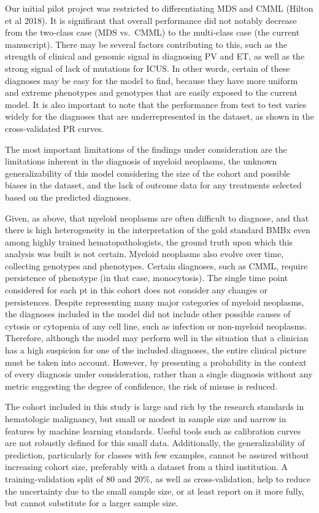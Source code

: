 \documentclass[
]{article}
\begin{document}
Our initial pilot project was restricted to differentiating MDS and CMML
(Hilton et al 2018). It is significant that overall performance did not
notably decrease from the two-class case (MDS vs.~CMML) to the
multi-class case (the current manuscript). There may be several factors
contributing to this, such as the strength of clinical and genomic
signal in diagnosing PV and ET, as well as the strong signal of lack of
mutations for ICUS. In other words, certain of these diagnoses may be
easy for the model to find, because they have more uniform and extreme
phenotypes and genotypes that are easily exposed to the current model.
It is also important to note that the performance from test to test
varies widely for the diagnoses that are underrepresented in the
dataset, as shown in the cross-validated PR curves.

The most important limitations of the findings under consideration are
the limitations inherent in the diagnosis of myeloid neoplasms, the
unknown generalizability of this model considering the size of the
cohort and possible biases in the dataset, and the lack of outcome data
for any treatments selected based on the predicted diagnoses.

Given, as above, that myeloid neoplasms are often difficult to diagnose,
and that there is high heterogeneity in the interpretation of the gold
standard BMBx even among highly trained hematopathologists, the ground
truth upon which this analysis was built is not certain. Myeloid
neoplasms also evolve over time, collecting genotypes and phenotypes.
Certain diagnoses, such as CMML, require persistence of phenotype (in
that case, monocytosis). The single time point considered for each pt in
this cohort does not consider any changes or persistences. Despite
representing many major categories of myeloid neoplasms, the diagnoses
included in the model did not include other possible causes of cytosis
or cytopenia of any cell line, such as infection or non-myeloid
neoplasms. Therefore, although the model may perform well in the
situation that a clinician has a high suspicion for one of the included
diagnoses, the entire clinical picture must be taken into account.
However, by presenting a probability in the context of every diagnosis
under consideration, rather than a single diagnosis without any metric
suggesting the degree of confidence, the risk of misuse is reduced.

The cohort included in this study is large and rich by the research
standards in hematologic malignancy, but small or modest in sample size
and narrow in features by machine learning standards. Useful tools such
as calibration curves are not robustly defined for this small data.
Additionally, the generalizability of prediction, particularly for
classes with few examples, cannot be assured without increasing cohort
size, preferably with a dataset from a third institution. A
training-validation split of 80 and 20\%, as well as cross-validation,
help to reduce the uncertainty due to the small sample size, or at least
report on it more fully, but cannot substitute for a larger sample size.
\end{document}
